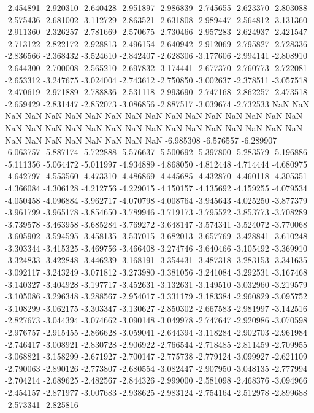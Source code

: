 -2.454891
-2.920310
-2.640428
-2.951897
-2.986839
-2.745655
-2.623370
-2.803088
-2.575436
-2.681002
-3.112729
-2.863521
-2.631808
-2.989447
-2.564812
-3.131360
-2.911360
-2.326257
-2.781669
-2.570675
-2.730466
-2.957283
-2.624937
-2.421547
-2.713122
-2.822172
-2.928813
-2.496154
-2.640942
-2.912069
-2.795827
-2.728336
-2.836566
-2.368432
-3.524610
-2.842407
-2.628306
-3.177606
-2.994141
-2.808910
-2.644300
-2.700008
-2.565210
-2.697832
-3.174441
-2.677370
-2.760773
-2.722081
-2.653312
-3.247675
-3.024004
-2.743612
-2.750850
-3.002637
-2.378511
-3.057518
-2.470619
-2.971889
-2.788836
-2.531118
-2.993690
-2.747168
-2.862257
-2.473518
-2.659429
-2.831447
-2.852073
-3.086856
-2.887517
-3.039674
-2.732533
NaN
NaN
NaN
NaN
NaN
NaN
NaN
NaN
NaN
NaN
NaN
NaN
NaN
NaN
NaN
NaN
NaN
NaN
NaN
NaN
NaN
NaN
NaN
NaN
NaN
NaN
NaN
NaN
NaN
NaN
NaN
NaN
NaN
NaN
NaN
NaN
NaN
NaN
NaN
NaN
-6.985308
-6.576557
-6.289907
-6.063757
-5.887174
-5.722888
-5.576637
-5.500692
-5.397800
-5.283579
-5.196886
-5.111356
-5.064472
-5.011997
-4.934889
-4.868050
-4.812448
-4.714444
-4.680975
-4.642797
-4.553560
-4.473310
-4.486869
-4.445685
-4.432870
-4.460118
-4.305351
-4.366084
-4.306128
-4.212756
-4.229015
-4.150157
-4.135692
-4.159255
-4.079534
-4.050458
-4.096884
-3.962717
-4.070798
-4.008764
-3.945643
-4.025250
-3.877379
-3.961799
-3.965178
-3.854650
-3.789946
-3.719173
-3.795522
-3.853773
-3.708289
-3.739578
-3.463958
-3.685284
-3.769272
-3.648147
-3.574341
-3.524072
-3.770068
-3.605902
-3.594595
-3.458135
-3.537015
-3.682013
-3.657769
-3.428841
-3.610248
-3.303344
-3.415325
-3.469756
-3.466408
-3.274746
-3.640466
-3.105492
-3.369910
-3.324833
-3.422848
-3.446239
-3.168191
-3.354431
-3.487318
-3.283153
-3.341635
-3.092117
-3.243249
-3.071812
-3.273980
-3.381056
-3.241084
-3.292531
-3.167468
-3.140327
-3.404928
-3.197717
-3.452631
-3.132631
-3.149510
-3.032960
-3.219579
-3.105086
-3.296348
-3.288567
-2.954017
-3.331179
-3.183384
-2.960829
-3.095752
-3.108299
-3.062175
-3.303347
-3.130627
-2.850302
-2.667583
-2.981997
-3.142516
-2.827673
-3.044394
-3.074662
-3.090148
-3.049978
-2.747647
-2.920986
-3.070598
-2.976757
-2.915455
-2.866628
-3.059041
-2.644394
-3.118284
-2.902703
-2.961984
-2.746417
-3.008921
-2.830728
-2.906922
-2.766544
-2.718485
-2.811459
-2.709955
-3.068821
-3.158299
-2.671927
-2.700147
-2.775738
-2.779124
-3.099927
-2.621109
-2.790063
-2.890126
-2.773807
-2.680554
-3.082447
-2.907950
-3.048135
-2.777994
-2.704214
-2.689625
-2.482567
-2.844326
-2.999000
-2.581098
-2.468376
-3.094966
-2.454157
-2.871977
-3.007683
-2.938625
-2.983124
-2.754164
-2.512978
-2.899688
-2.573341
-2.825816
